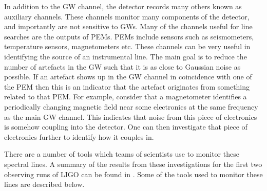 %
In addition to the \gls{GW} channel, the detector
records many others known as auxiliary channels.  These channels
monitor many components of the detector, and importantly are not sensitive to
\glspl{GW}.  Many of the channels useful for line searches are the outputs of \glspl{PEM}.
\glspl{PEM} include sensors such as seismometers, temperature sensors,
magnetometers etc.  These channels can be very useful in identifying the source
of an instrumental line.  The main goal is to reduce the number of artefacts in
the \gls{GW} such that it is as close to Gaussian noise as possible.  If an
artefact shows up in the \gls{GW} channel in coincidence with one of the
\gls{PEM} then this is an indicator that the artefact originates from something
related to that \gls{PEM}.  For example, consider
that a magnetometer identifies a periodically changing magnetic field near some electronics  at the same frequency as
the main \gls{GW} channel.  This indicates that noise from this piece of
electronics is somehow coupling into the detector.  One can then investigate
that piece of electronics further to identify how it couples in.

%

There are a number of tools which teams of scientists use to monitor these spectral lines.
A summary of the results from these investigations for the first two observing runs of \gls{LIGO} can be found in
\citep{covas2018IdentificationMitigation}.  Some of the tools used to monitor these lines are
described below.

